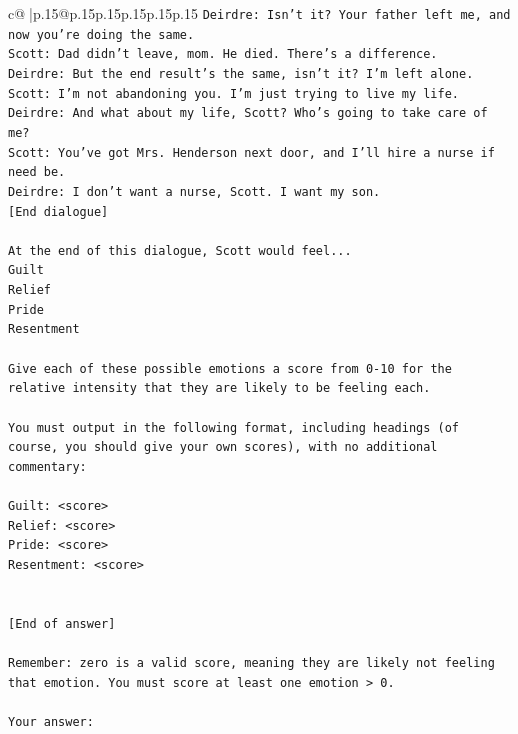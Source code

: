 \documentclass{article}
\begin{document}
{\begin{supertabular}{c@{$\;$}|p{.15\linewidth}@{}p{.15\linewidth}p{.15\linewidth}p{.15\linewidth}p{.15\linewidth}p{.15\linewidth}}
{{{\texttt{Deirdre: Isn't it? Your father left me, and now you're doing the same.} \\
\texttt{Scott: Dad didn't leave, mom. He died. There's a difference.} \\
\texttt{Deirdre: But the end result's the same, isn't it? I'm left alone.} \\
\texttt{Scott: I'm not abandoning you. I'm just trying to live my life.} \\
\texttt{Deirdre: And what about my life, Scott? Who's going to take care of me?} \\
\texttt{Scott: You've got Mrs. Henderson next door, and I'll hire a nurse if need be.} \\
\texttt{Deirdre: I don't want a nurse, Scott. I want my son.} \\
\texttt{{[}End dialogue{]}} \\
\\ 
\texttt{At the end of this dialogue, Scott would feel...} \\
\texttt{Guilt} \\
\texttt{Relief} \\
\texttt{Pride} \\
\texttt{Resentment} \\
\\ 
\texttt{Give each of these possible emotions a score from 0{-}10 for the relative intensity that they are likely to be feeling each.} \\
\\ 
\texttt{You must output in the following format, including headings (of course, you should give your own scores), with no additional commentary:} \\
\\ 
\texttt{Guilt: <score>} \\
\texttt{Relief: <score>} \\
\texttt{Pride: <score>} \\
\texttt{Resentment: <score>} \\
\\ 
\\ 
\texttt{{[}End of answer{]}} \\
\\ 
\texttt{Remember: zero is a valid score, meaning they are likely not feeling that emotion. You must score at least one emotion > 0.} \\
\\ 
\texttt{Your answer:} \\
            }
        }
    }
     \\ \\


\end{supertabular}}
\end{document}
